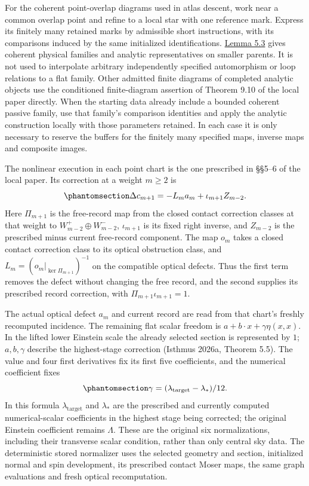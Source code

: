 \documentclass[
  english,
  11pt,
  reqno]{amsart}
\begin{document}
For the coherent point-overlap diagrams used in atlas descent, work near
a common overlap point and refine to a local star with one reference
mark. Express its finitely many retained marks by admissible short
instructions, with its comparisons induced by the same initialized
identifications.
\hyperref[lem:compatible-source-amplitude-diagrams]{Lemma 5.3} gives
coherent physical families and analytic representatives on smaller
parents. It is not used to interpolate arbitrary independently specified
automorphism or loop relations to a flat family. Other admitted finite
diagrams of completed analytic objects use the conditioned
finite-diagram assertion of Theorem 9.10 of the local paper directly.
When the starting data already include a bounded coherent passive
family, use that family's comparison identities and apply the analytic
construction locally with those parameters retained. In each case it is
only necessary to reserve the buffers for the finitely many specified
maps, inverse maps and composite images.

The nonlinear execution in each point chart is the one prescribed in
§§5--6 of the local paper. Its correction at a weight \(m\ge2\) is
\begin{equation}\protect\phantomsection\label{eq:atlas-original-nonlinear-correction}{
\Delta c_{m+1}
=-L_m a_m+\iota_{m+1}Z_{m-2}.
}\end{equation} Here \(\Pi_{m+1}\) is the free-record map from the
closed contact correction classes at that weight to
\(W_{m-2}^+\oplus W_{m-2}^-\), \(\iota_{m+1}\) is its fixed right
inverse, and \(Z_{m-2}\) is the prescribed minus current free-record
component. The map \(o_m\) takes a closed contact correction class to
its optical obstruction class, and \(L_m=(o_m|_{\ker\Pi_{m+1}})^{-1}\)
on the compatible optical defects. Thus the first term removes the
defect without changing the free record, and the second supplies its
prescribed record correction, with \(\Pi_{m+1}\iota_{m+1}=1\).

The actual optical defect \(a_m\) and current record are read from that
chart's freshly recomputed incidence. The remaining flat scalar freedom
is \(a+b\cdot x+\gamma\eta(x,x)\). In the lifted lower Einstein scale
the already selected section is represented by \(1\); \(a,b,\gamma\)
describe the highest-stage correction (Isthmus 2026a, Theorem 5.5). The
value and four first derivatives fix its first five coefficients, and
the numerical coefficient fixes
\begin{equation}\protect\phantomsection\label{eq:atlas-sixth-scale-normalization}{
\gamma=(\lambda_{\mathrm{target}}-\lambda_*)/12.
}\end{equation} In this formula \(\lambda_{\mathrm{target}}\) and
\(\lambda_*\) are the prescribed and currently computed numerical-scalar
coefficients in the highest stage being corrected; the original Einstein
coefficient remains \(\Lambda\). These are the original six
normalizations, including their transverse scalar condition, rather than
only central sky data. The deterministic stored normalizer uses the
selected geometry and section, initialized normal and spin development,
its prescribed contact Moser maps, the same graph evaluations and fresh
optical recomputation.
\end{document}

